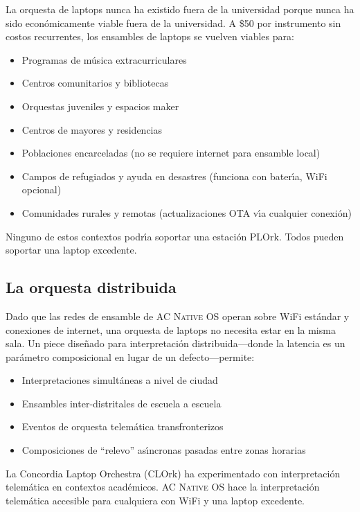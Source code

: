 \documentclass[10pt,letterpaper,twocolumn]{article}
\newcommand{\acos}{\textsc{AC Native OS}}
\begin{document}
La orquesta de laptops nunca ha existido fuera de la universidad porque nunca ha sido econ\'{o}micamente viable fuera de la universidad. A \$50 por instrumento sin costos recurrentes, los ensambles de laptops se vuelven viables para:

\begin{itemize}
  \item Programas de m\'{u}sica extracurriculares
  \item Centros comunitarios y bibliotecas
  \item Orquestas juveniles y espacios maker
  \item Centros de mayores y residencias
  \item Poblaciones encarceladas (no se requiere internet para ensamble local)
  \item Campos de refugiados y ayuda en desastres (funciona con bater\'{\i}a, WiFi opcional)
  \item Comunidades rurales y remotas (actualizaciones OTA v\'{\i}a cualquier conexi\'{o}n)
\end{itemize}

Ninguno de estos contextos podr\'{\i}a soportar una estaci\'{o}n PLOrk. Todos pueden soportar una laptop excedente.

\subsection{La orquesta distribuida}

Dado que las redes de ensamble de \acos{} operan sobre WiFi est\'{a}ndar y conexiones de internet, una orquesta de laptops no necesita estar en la misma sala. Un piece dise\~{n}ado para interpretaci\'{o}n distribuida---donde la latencia es un par\'{a}metro composicional en lugar de un defecto---permite:

\begin{itemize}
  \item Interpretaciones simult\'{a}neas a nivel de ciudad
  \item Ensambles inter-distritales de escuela a escuela
  \item Eventos de orquesta telem\'{a}tica transfronterizos
  \item Composiciones de ``relevo'' as\'{\i}ncronas pasadas entre zonas horarias
\end{itemize}

La Concordia Laptop Orchestra (CLOrk) ha experimentado con interpretaci\'{o}n telem\'{a}tica en contextos acad\'{e}micos. \acos{} hace la interpretaci\'{o}n telem\'{a}tica accesible para cualquiera con WiFi y una laptop excedente.
\end{document}
